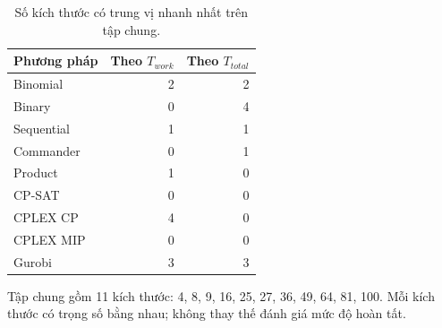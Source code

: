 \begin{table}[pos=H]
\centering
\small
\caption{Số kích thước có trung vị nhanh nhất trên tập chung.}
\label{tab:matched_winners}
\setlength{\tabcolsep}{4pt}
\begin{tabular}{@{}lrr@{}}
\toprule
Phương pháp & Theo $T_{work}$ & Theo $T_{total}$ \\
\midrule
Binomial & 2 & 2 \\
Binary & 0 & 4 \\
Sequential & 1 & 1 \\
Commander & 0 & 1 \\
Product & 1 & 0 \\
CP-SAT & 0 & 0 \\
CPLEX CP & 4 & 0 \\
CPLEX MIP & 0 & 0 \\
Gurobi & 3 & 3 \\
\bottomrule
\end{tabular}
\par\smallskip\begin{minipage}{\linewidth}\footnotesize Tập chung gồm 11 kích thước: 4, 8, 9, 16, 25, 27, 36, 49, 64, 81, 100. Mỗi kích thước có trọng số bằng nhau; không thay thế đánh giá mức độ hoàn tất.\end{minipage}
\end{table}

